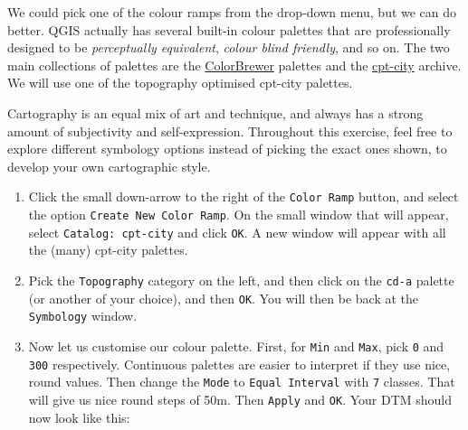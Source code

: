 \documentclass[
  letterpaper,
  DIV=11,
  numbers=noendperiod]{scrreprt}
\begin{document}
We could pick one of the colour ramps from the drop-down menu, but we
can do better. QGIS actually has several built-in colour palettes that
are professionally designed to be \emph{perceptually equivalent},
\emph{colour blind friendly}, and so on. The two main collections of
palettes are the
\href{https://colorbrewer2.org/\#type=sequential&scheme=BuGn&n=3}{ColorBrewer}
palettes and the
\href{http://seaviewsensing.com/pub/cpt-city/}{cpt-city} archive. We
will use one of the topography optimised cpt-city palettes.

\begin{tcolorbox}[enhanced jigsaw, breakable, toptitle=1mm, colback=white, left=2mm, leftrule=.75mm, titlerule=0mm, colframe=quarto-callout-tip-color-frame, opacityback=0, title=\textcolor{quarto-callout-tip-color}{\faLightbulb}\hspace{0.5em}{Tip}, toprule=.15mm, opacitybacktitle=0.6, bottomtitle=1mm, colbacktitle=quarto-callout-tip-color!10!white, bottomrule=.15mm, coltitle=black, rightrule=.15mm, arc=.35mm]

Cartography is an equal mix of art and technique, and always has a
strong amount of subjectivity and self-expression. Throughout this
exercise, feel free to explore different symbology options instead of
picking the exact ones shown, to develop your own cartographic style.

\end{tcolorbox}

\begin{enumerate}
\def\labelenumi{(\arabic{enumi})}
\setcounter{enumi}{206}
\item
  Click the small down-arrow to the right of the \texttt{Color\ Ramp}
  button, and select the option \texttt{Create\ New\ Color\ Ramp}. On
  the small window that will appear, select \texttt{Catalog:\ cpt-city}
  and click \texttt{OK}. A new window will appear with all the (many)
  cpt-city palettes.
\item
  Pick the \texttt{Topography} category on the left, and then click on
  the \texttt{cd-a} palette (or another of your choice), and then
  \texttt{OK}. You will then be back at the \texttt{Symbology} window.
\item
  Now let us customise our colour palette. First, for \texttt{Min} and
  \texttt{Max}, pick \texttt{0} and \texttt{300} respectively.
  Continuous palettes are easier to interpret if they use nice, round
  values. Then change the \texttt{Mode} to \texttt{Equal\ Interval} with
  \texttt{7} classes. That will give us nice round steps of 50m. Then
  \texttt{Apply} and \texttt{OK}. Your DTM should now look like this:
\end{enumerate}
\end{document}
